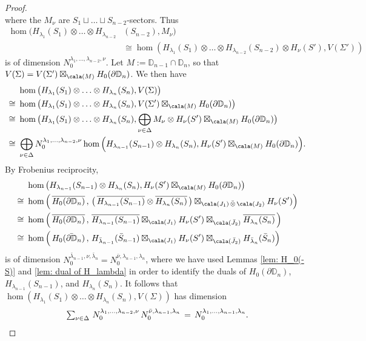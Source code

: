 \documentclass[a4paper,10pt,leqno]{amsart}
\newcommand{\ID}{\mathbb{D}}     \newcommand{\cald}{\mathcal{D}}
\theoremstyle{plain}
\theoremstyle{definition}
\theoremstyle{remark}
\newcommand{\ox}{{\otimes}}
\begin{document}
\begin{proof}
\begin{equation*}
\end{equation*}
where the $M_\nu$ are $S_1 \sqcup \ldots \sqcup S_{n-2}$-sectors.
Thus
\begin{equation*}
\begin{split}
  \hom( H_{\lambda_1}(S_1) \ox  \dots \ox  H_{\lambda_{n-2}} & (S_{n-2}),  M_\nu) \\
   &  \cong \hom( H_{\lambda_1}(S_1) \ox \dots \ox H_{\lambda_{n-2}}(S_{n-2})
     \ox H_\nu(S' ) , V(\Sigma') ) 
\end{split}
\end{equation*} 
is of dimension $N_0^{\lambda_1,\ldots,\lambda_{n-2},\nu}$.
Let $M:=\ID_{n-1}\cap \ID_n$, so that $V(\Sigma)=V(\Sigma')\boxtimes_{\cala(M)}H_0(\partial\ID_n)$.
We then have
\[
\begin{split}
&\hom\big(H_{\lambda_1}(S_1)\otimes\ldots\otimes H_{\lambda_n}(S_n),V(\Sigma)\big)\\
\cong\,\, &
\hom\big(H_{\lambda_1}(S_1)\otimes\ldots\otimes H_{\lambda_n}(S_n),V(\Sigma')\boxtimes_{\cala(M)}H_0(\partial\ID_n)\big)\\
\cong\,\, &
\hom\big(H_{\lambda_1}(S_1) \otimes\ldots\otimes H_{\lambda_n}(S_n),
           \bigoplus_{\nu \in \Delta} M_\nu  \otimes H_\nu(S') 
                     \boxtimes_{\cala(M)}H_0(\partial\ID_n)\big)\\
\cong\,\, &\bigoplus_{\nu\in\Delta}N_0^{\lambda_1,\ldots,\lambda_{n-2},\nu}\hom\Big(H_{\lambda_{n-1}}(S_{n-1})\otimes H_{\lambda_n}(S_n),H_\nu(S')\boxtimes_{\cala(M)}H_0(\partial\ID_n)\Big).
\end{split}
\]
By Frobenius reciprocity,
\[
\begin{split}
&\hom\big(H_{\lambda_{n-1}}(S_{n-1})\otimes H_{\lambda_n}(S_n),H_\nu(S')\boxtimes_{\cala(M)}H_0(\partial\ID_n)\big)\\
\cong\,\,&\hom\Big(\,\overline{H_0(\partial\ID_n)}\,,\,\big(\,\overline{H_{\lambda_{n-1}}(S_{n-1})}\otimes \overline{H_{\lambda_n}(S_n)}\,\big)\boxtimes_{\cala(J_1)\,\bar\otimes\,\cala(J_2)}H_\nu(S')\Big)\\
\cong\,\,&
\hom\Big(\,\overline{H_0(\partial\ID_n)}\,,\,\overline{H_{\lambda_{n-1}}(S_{n-1})}\boxtimes_{\cala(J_1)}H_\nu(S')\boxtimes_{\cala(\bar J_2)} \overline{H_{\lambda_n}(S_n)}\,\Big)\\
\cong\,\,&
\hom\Big(\,H_0(\bar{\partial\ID}_n)\,,\,H_{\bar\lambda_{n-1}}(\bar S_{n-1})\boxtimes_{\cala(J_1)}H_\nu(S')\boxtimes_{\cala(\bar J_2)} H_{\bar\lambda_n}(\bar S_n)\Big)\\
\end{split}
\]
is of dimension $N_0^{\bar\lambda_{n-1},\nu,\bar\lambda_n}=N_0^{\bar\nu,\lambda_{n-1},\lambda_n}$, where we have used Lemmas \ref{lem: H_0(-S)} and \ref{lem: dual of H_lambda} in order to identify the duals of $H_0(\partial \ID_n)$, $H_{\lambda_{n-1}}(S_{n-1})$, and $H_{\lambda_n}(S_n)$.
It follows that $\hom(H_{\lambda_1}(S_1)\otimes\ldots\otimes H_{\lambda_n}(S_n),V(\Sigma))$ has dimension
\[\textstyle
\sum_{\nu\in\Delta}\,N_0^{\lambda_1,\ldots,\lambda_{n-2},\nu}\,N_0^{\bar\nu,\lambda_{n-1},\lambda_n}\,=\,N_0^{\lambda_1,\ldots,\lambda_{n-1},\lambda_n}.
\qedhere
\]
\end{proof}
\end{document}
